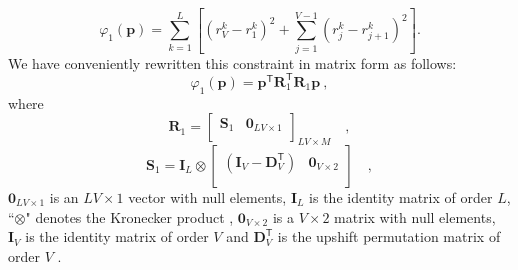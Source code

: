 \begin{equation}\label{eq:phi1_sum}
\varphi_{1}(\mathbf{p}) = \sum\limits^{L}_{k=1}\left[\left(r^{k}_{V}-r^{k}_{1}\right)^2 + \sum\limits^{V-1}_{j=1}\left(r^{k}_{j}-r^{k}_{j+1}\right)^2\right] .
\end{equation}
We have conveniently rewritten this constraint in matrix form as follows:
\begin{equation}
\varphi_{1}(\mathbf{p}) = \mathbf{p}^{\mathsf{T}} \mathbf{R}^{\mathsf{T}}_{1}\mathbf{R}_{1} \mathbf{p} \: ,
\label{eq:phi1}
\end{equation}
where 
\begin{equation}
\mathbf{R}_{1} = \begin{bmatrix} 
\mathbf{S}_{1} & \mathbf{0}_{LV \times 1} \\
\end{bmatrix}_{LV \times M} \quad ,
\label{eq:R1-matrix}
\end{equation}
\begin{equation}
\mathbf{S}_{1} = 
\mathbf{I}_{L} \otimes 
\begin{bmatrix}
\left( \mathbf{I}_{V} - \mathbf{D}_{V}^\mathsf{T} \right) & \mathbf{0}_{V \times 2} \\
\end{bmatrix} \quad ,
\label{eq:S1-matrix}
\end{equation}
$\mathbf{0}_{LV \times 1}$ is an $LV \times 1$ vector with null elements, 
$\mathbf{I}_{L}$ is the identity matrix of order $L$, ``$\otimes$" denotes the Kronecker product 
\citep[][ p. 243]{horn_johnson1991}, $\mathbf{0}_{V \times 2}$ is a $V \times 2$ matrix with null elements, 
$\mathbf{I}_{V}$ is the identity matrix of order $V$ and $\mathbf{D}_{V}^\mathsf{T}$ is the upshift permutation 
matrix of order $V$ \citep[][ p. 20]{golub-vanloan2013}.

